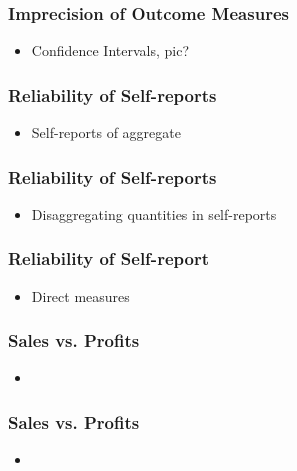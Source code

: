 \documentclass[10pt]{beamer}
\begin{document}
\begin{frame}
\frametitle{Imprecision of Outcome Measures}
	\begin{itemize}
	\item Confidence Intervals, pic?
	\vspace{0.1in}
	\end{itemize}
\end{frame}

\begin{frame}
\frametitle{Reliability of Self-reports}
	\begin{itemize}
	\item Self-reports of aggregate
	\vspace{0.1in}
	\end{itemize}
\end{frame}

\begin{frame}
\frametitle{Reliability of Self-reports}
	\begin{itemize}
	\item Disaggregating quantities in self-reports
	\vspace{0.1in}
	\end{itemize}
\end{frame}

\begin{frame}
\frametitle{Reliability of Self-report}
	\begin{itemize}
	\item Direct measures
	\vspace{0.1in}
	\end{itemize}
\end{frame}


\begin{frame}
\frametitle{Sales vs. Profits}
	\begin{itemize}
	\item 
	\vspace{0.1in}
	\end{itemize}
\end{frame}

\begin{frame}
\frametitle{Sales vs. Profits}
	\begin{itemize}
	\item 
	\vspace{0.1in}
	\end{itemize}
\end{frame}

\end{document}
